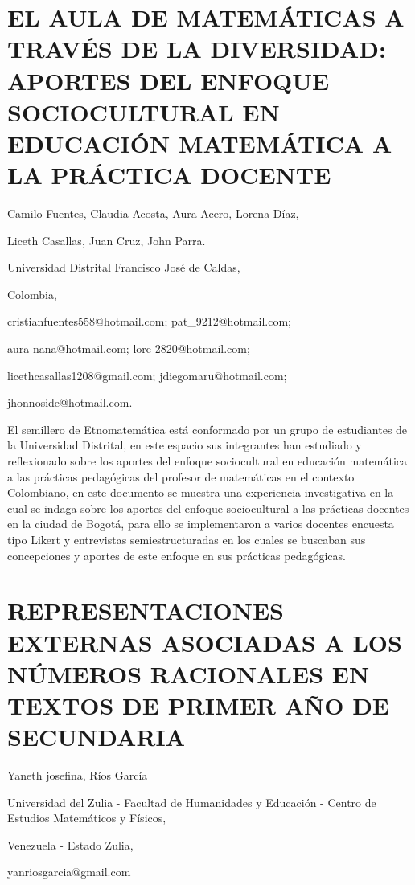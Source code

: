 \section{\uppercase{ El aula de matemáticas a través de la diversidad: aportes
del enfoque sociocultural en educación matemática a la práctica docente}}

\begin{datos}

Camilo Fuentes, Claudia Acosta, Aura Acero, Lorena Díaz,

Liceth Casallas, Juan Cruz, John Parra.

Universidad Distrital Francisco José de Caldas,

Colombia,

cristianfuentes558@hotmail.com; pat\_9212@hotmail.com;

aura-nana@hotmail.com; lore-2820@hotmail.com;

licethcasallas1208@gmail.com; jdiegomaru@hotmail.com; 

jhonnoside@hotmail.com. 

\end{datos}

El semillero de Etnomatemática está conformado por un grupo de estudiantes
de la Universidad Distrital, en este espacio sus integrantes han estudiado
y reflexionado sobre los aportes del enfoque sociocultural en educación
matemática a las prácticas pedagógicas del profesor de matemáticas
en el contexto Colombiano, en este documento se muestra una experiencia
investigativa en la cual se indaga sobre los aportes del enfoque sociocultural
a las prácticas docentes en la ciudad de Bogotá, para ello se implementaron
a varios docentes encuesta tipo Likert y entrevistas semiestructuradas
en los cuales se buscaban sus concepciones y aportes de este enfoque
en sus prácticas pedagógicas.


\section{REPRESENTACIONES EXTERNAS ASOCIADAS A LOS NÚMEROS RACIONALES EN TEXTOS
DE PRIMER AÑO DE SECUNDARIA}

\begin{datos}

Yaneth josefina, Ríos García

Universidad del Zulia - Facultad de Humanidades y Educación - Centro
de Estudios Matemáticos y Físicos, 

Venezuela - Estado Zulia,

yanriosgarcia@gmail.com 

\end{datos}

